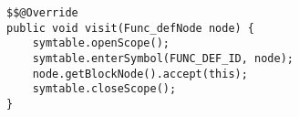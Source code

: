 \begin{lstlisting}[caption={Visit function definition node in return statement visitor}, label={code:ReturnCheck:FuncDef}]
$$@Override
public void visit(Func_defNode node) {
    symtable.openScope();
    symtable.enterSymbol(FUNC_DEF_ID, node);
    node.getBlockNode().accept(this);
    symtable.closeScope();
}
\end{lstlisting}